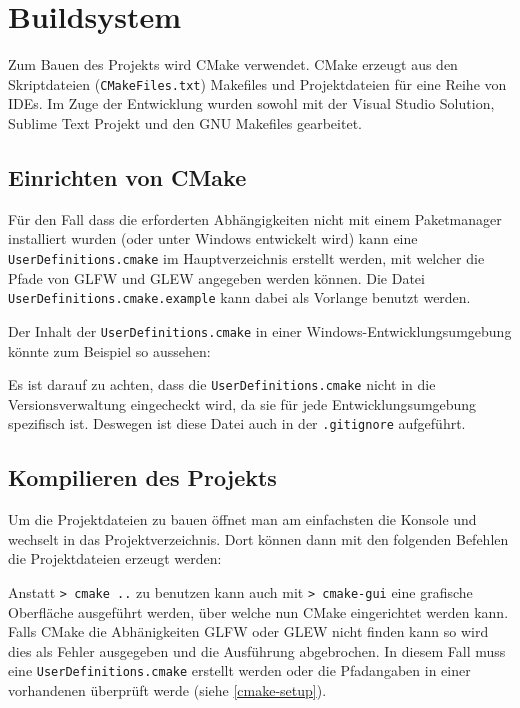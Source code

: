\documentclass[12pt, a4paper, titlepage, hidelinks]{scrreprt}
\begin{document}
\section{Buildsystem}
Zum Bauen des Projekts wird CMake verwendet. CMake erzeugt aus den Skriptdateien (\texttt{CMakeFiles.txt}) Makefiles und Projektdateien für eine Reihe von IDEs. Im Zuge der Entwicklung wurden sowohl mit der Visual Studio Solution, Sublime Text Projekt und den GNU Makefiles gearbeitet.  

\subsection{Einrichten von CMake}
\label{cmake-setup}
Für den Fall dass die erforderten Abhängigkeiten nicht mit einem Paketmanager installiert wurden (oder unter Windows entwickelt wird) kann eine \texttt{UserDefinitions.cmake} im Hauptverzeichnis erstellt werden, mit welcher die Pfade von GLFW und GLEW angegeben werden können. Die Datei \texttt{UserDefinitions.cmake.example} kann dabei als Vorlange benutzt werden.

Der Inhalt der \texttt{UserDefinitions.cmake} in einer Windows-Entwicklungsumgebung könnte zum Beispiel so aussehen:


Es ist darauf zu achten, dass die \texttt{UserDefinitions.cmake} nicht in die Versionsverwaltung eingecheckt wird, da sie für jede Entwicklungsumgebung spezifisch ist. Deswegen ist diese Datei auch in der \texttt{.gitignore} aufgeführt.

\subsection{Kompilieren des Projekts}
Um die Projektdateien zu bauen öffnet man am einfachsten die Konsole und wechselt in das Projektverzeichnis. Dort können dann mit den folgenden Befehlen die Projektdateien erzeugt werden:

Anstatt \texttt{>~cmake ..} zu benutzen kann auch mit \texttt{>~cmake-gui} eine grafische Oberfläche ausgeführt werden, über welche nun CMake eingerichtet werden kann. Falls CMake die Abhänigkeiten GLFW oder GLEW nicht finden kann so wird dies als Fehler ausgegeben und die Ausführung abgebrochen. In diesem Fall muss eine \texttt{UserDefinitions.cmake} erstellt werden oder die Pfadangaben in einer vorhandenen überprüft werde (siehe \autoref{cmake-setup}).
\end{document}
